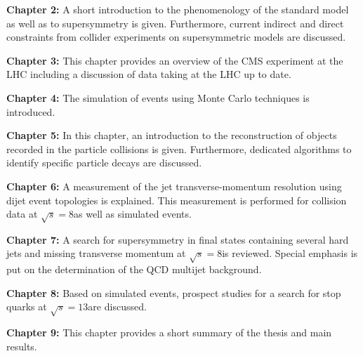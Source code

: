 \begin{description}
 \item \textbf{Chapter 2:} A short introduction to the phenomenology of the standard model as well as to supersymmetry is given. Furthermore, current indirect and direct constraints from collider experiments on supersymmetric models are discussed.
 \item \textbf{Chapter 3:} This chapter provides an overview of the CMS experiment at the LHC including a discussion of data taking at the LHC up to date.
 \item \textbf{Chapter 4:} The simulation of events using Monte Carlo techniques is introduced.
 \item \textbf{Chapter 5:} In this chapter, an introduction to the reconstruction of objects recorded in the particle collisions is given. Furthermore, dedicated algorithms to identify specific particle decays are discussed.
 \item \textbf{Chapter 6:} A measurement of the jet transverse-momentum resolution using dijet event topologies is explained. This measurement is performed for \pp collision data at $\sqrt{s} = 8$\tev as well as simulated events.
 \item \textbf{Chapter 7:} A search for supersymmetry in final states containing several hard jets and missing transverse momentum at $\sqrt{s} = 8$\tev is reviewed. Special emphasis is put on the determination of the QCD multijet background.
 \item \textbf{Chapter 8:} Based on simulated events, prospect studies for a search for stop quarks at $\sqrt{s} = 13$\tev are discussed.
 \item \textbf{Chapter 9:} This chapter provides a short summary of the thesis and main results.
\end{description}
